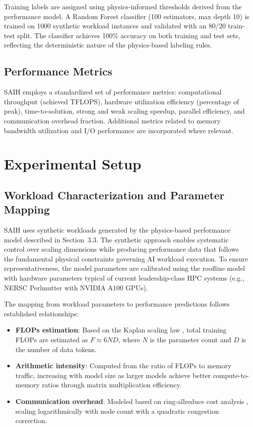 \documentclass{llncs}
\begin{document}
Training labels are assigned using physics-informed thresholds derived from the performance model. A Random Forest classifier (100 estimators, max depth 10) is trained on 1000 synthetic workload instances and validated with an 80/20 train-test split. The classifier achieves 100\% accuracy on both training and test sets, reflecting the deterministic nature of the physics-based labeling rules.

\subsection{Performance Metrics}

SAIH employs a standardized set of performance metrics: computational throughput (achieved TFLOPS), hardware utilization efficiency (percentage of peak), time-to-solution, strong and weak scaling speedup, parallel efficiency, and communication overhead fraction. Additional metrics related to memory bandwidth utilization and I/O performance are incorporated where relevant.

\section{Experimental Setup}

\subsection{Workload Characterization and Parameter Mapping}

SAIH uses synthetic workloads generated by the physics-based performance model described in Section~3.3. The synthetic approach enables systematic control over scaling dimensions while producing performance data that follows the fundamental physical constraints governing AI workload execution. To ensure representativeness, the model parameters are calibrated using the roofline model \cite{Williams2009Roofline} with hardware parameters typical of current leadership-class HPC systems (e.g., NERSC Perlmutter with NVIDIA A100 GPUs).

The mapping from workload parameters to performance predictions follows established relationships:

\begin{itemize}
    \item \textbf{FLOPs estimation}: Based on the Kaplan scaling law \cite{Kaplan2020ScalingLaws}, total training FLOPs are estimated as $F \approx 6 N D$, where $N$ is the parameter count and $D$ is the number of data tokens.
    \item \textbf{Arithmetic intensity}: Computed from the ratio of FLOPs to memory traffic, increasing with model size as larger models achieve better compute-to-memory ratios through matrix multiplication efficiency.
    \item \textbf{Communication overhead}: Modeled based on ring-allreduce cost analysis \cite{Thakur2005Allreduce}, scaling logarithmically with node count with a quadratic congestion correction.
\end{itemize}
\end{document}
